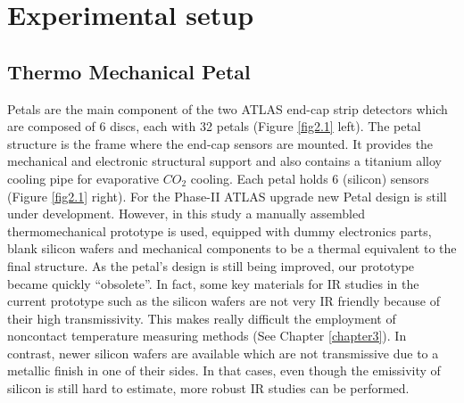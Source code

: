 \pagestyle{standard}

\chapter{Experimental setup}\label{chapter2}

	\thispagestyle{chapter-first-page}
	
	\section{Thermo Mechanical Petal}\label{section2.1}
	
		Petals are the main component of the two ATLAS end-cap strip detectors which are composed of 6 discs, each with 32 petals (Figure \ref{fig2.1} left). The petal structure is the frame where the end-cap sensors are mounted. It provides the mechanical and electronic structural support and also contains a titanium alloy cooling pipe for evaporative $CO_{2}$ cooling. Each petal holds 6 (silicon) sensors (Figure \ref{fig2.1} right). For the Phase-II ATLAS upgrade new Petal design is still under development. However, in this study a manually assembled thermomechanical prototype is used, equipped with dummy electronics parts, blank silicon wafers and mechanical components to be a thermal equivalent to the final structure. As the petal’s design is still being improved, our prototype became quickly “obsolete”. In fact, some key materials for IR studies in the current prototype such as the silicon wafers are not very IR friendly because of their high transmissivity. This makes really difficult the employment of noncontact temperature measuring methods (See Chapter \ref{chapter3}). In contrast, newer silicon wafers are available which are not transmissive due to a metallic finish in one of their sides. In that cases, even though the emissivity of silicon is still hard to estimate, more robust IR studies can be performed.
				
